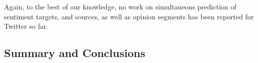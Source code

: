 \citet{Wang:15}





Again, to the best of our knowledge, no work on simultaneous
prediction of sentiment targets, and sources, as well as opinion
segments has been reported for Twitter so far.


\subsection{Summary and Conclusions}\label{slsa:subsec:conclusions}
